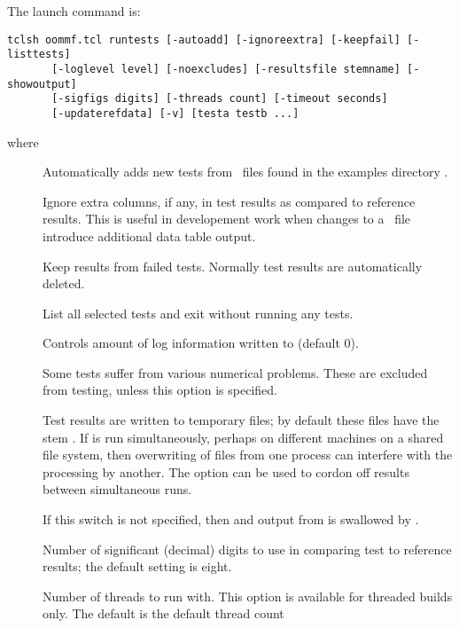 The  launch command is:
\begin{verbatim}
tclsh oommf.tcl runtests [-autoadd] [-ignoreextra] [-keepfail] [-listtests]
       [-loglevel level] [-noexcludes] [-resultsfile stemname] [-showoutput]
       [-sigfigs digits] [-threads count] [-timeout seconds]
       [-updaterefdata] [-v] [testa testb ...]
\end{verbatim}
where
\begin{description}
\item[]
 Automatically adds new tests from \MIF\ files found in the examples
 directory .
\item[]
 Ignore extra columns, if any, in test results as compared to
 reference results.  This is useful in developement work when
 changes to a \MIF\ file introduce additional data table output.
\item[]
  Keep results from failed tests.  Normally test results are
  automatically deleted.
\item[]
  List all selected tests and exit without running any tests.
\item[]
  Controls amount of log information written to 
  (default 0).
\item[]
  Some tests suffer from various numerical problems.  These are
  excluded from testing, unless this option is specified.
\item[]
  Test results are written to temporary files; by default these files
  have the stem .  If 
  is run simultaneously, perhaps on different machines on a shared
  file system, then overwriting of files from one process can
  interfere with the processing by another.  The 
  option can be used to cordon off results between simultaneous runs.
\item[]
  If this switch is not specified, then  and 
  output from  is swallowed by .
\item[]
 Number of significant (decimal) digits to use in comparing test to
 reference results; the default setting is eight.
\item[]
 Number of threads to run  with.  This option is available
 for threaded builds only.  The default is the default thread count

\end{description}
